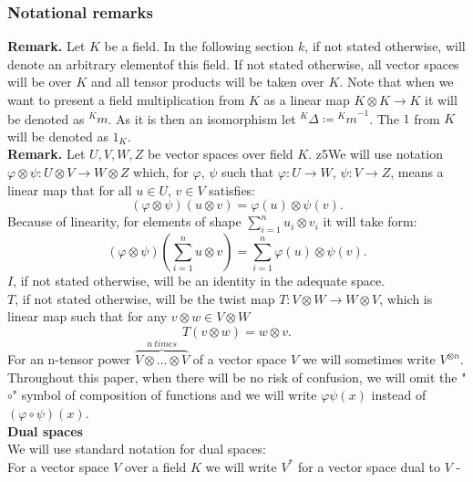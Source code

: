 \documentclass[a4paper, 12pt]{article}
\begin{document}
\subsubsection{Notational remarks}
\indent \textbf{Remark. }Let $K$ be a field. In the following section $k$, if not stated otherwise, will
denote an arbitrary elementof this field. If not stated otherwise, all vector spaces will be over $K$
and all tensor products will be taken over $K$. Note that when we want to present a field
multiplication from $K$ as a linear map $K \otimes K \to K$ it will be denoted as ${^Km}$. As it is then an
isomorphism let ${^K\Delta} \coloneqq {^Km}^{-1}$. The $1$ from $K$ will be denoted as $1_K$.\\[8pt]
\textbf{Remark. } Let $U, V, W, Z$ be vector spaces over field $K$.
z5We will use notation
$\varphi \otimes \psi:U \otimes V \to W \otimes Z$ which, for
$\varphi$, $\psi$ such that $\varphi : U \to W$, $\psi : V \to Z$, means a linear map that
for all $u \in U$, $v \in V$ satisfies:
\begin{equation*}
(\varphi \otimes \psi)(u \otimes v) = \varphi(u) \otimes \psi(v).
\end{equation*}
Because of linearity, for elements of shape $\displaystyle\sum^n_{i=1} u_i \otimes v_i$ it will take form:
\begin{equation*}
(\varphi \otimes \psi)(\sum^n_{i = 1} u \otimes v) = \sum^n_{i = 1}\varphi(u) \otimes \psi(v).
\end{equation*}
$I$, if not stated otherwise, will be an identity in the adequate space. \\
$T$, if not stated otherwise, will
be the twist map $T:V \otimes W \to W\otimes V$, which is linear map such that for any $v \otimes w
\in V \otimes W$
\begin{equation*}
T(v \otimes w) = w\otimes v.
\end{equation*}
For an n-tensor power $\overbrace{V \otimes \dots \otimes V}^{n\ times}$  of a vector space $V$ we will
sometimes write $V^{\otimes n}$.\\
Throughout this paper, when there will be no risk
of confusion, we will omit the "$\circ$" symbol of composition of functions and we will write
$\varphi \psi (x)$ instead of $(\varphi \circ \psi)(x)$. \\
\textbf{Dual spaces} \\
We will use standard notation for dual spaces: \\
For a vector space $V$ over a field $K$ we will write $V^*$ for a vector space dual to $V$ -
\end{document}
